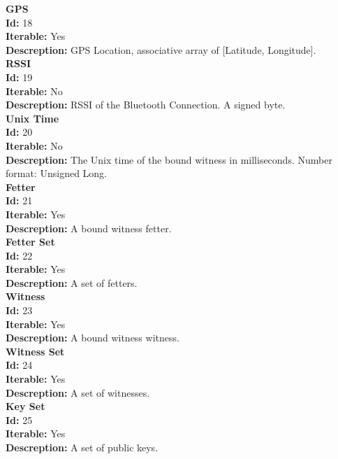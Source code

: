 \documentclass[11pt]{article}
\begin{document}
\noindent
\textbf{GPS} \\
\indent \textbf{Id:} 18 \\
\indent \textbf{Iterable:} Yes \\
\indent \textbf{Descreption:} GPS Location, associative array of [Latitude, Longitude]. \\

\noindent
\textbf{RSSI} \\
\indent \textbf{Id:} 19 \\
\indent \textbf{Iterable:} No \\
\indent \textbf{Descreption:} RSSI of the Bluetooth Connection. A signed byte. \\

\noindent
\textbf{Unix Time} \\
\indent \textbf{Id:} 20 \\
\indent \textbf{Iterable:} No \\
\indent \textbf{Descreption:} The Unix time of the bound witness in milliseconds. Number format: Unsigned Long. \\

\noindent
\textbf{Fetter} \\
\indent \textbf{Id:} 21 \\
\indent \textbf{Iterable:} Yes \\
\indent \textbf{Descreption:} A bound witness fetter. \\

\noindent
\textbf{Fetter Set} \\
\indent \textbf{Id:} 22 \\
\indent \textbf{Iterable:} Yes \\
\indent \textbf{Descreption:} A set of fetters. \\

\noindent
\textbf{Witness} \\
\indent \textbf{Id:} 23 \\
\indent \textbf{Iterable:} Yes \\
\indent \textbf{Descreption:} A bound witness witness. \\

\noindent
\textbf{Witness Set} \\
\indent \textbf{Id:} 24 \\
\indent \textbf{Iterable:} Yes \\
\indent \textbf{Descreption:} A set of witnesses. \\

\noindent
\textbf{Key Set} \\
\indent \textbf{Id:} 25 \\
\indent \textbf{Iterable:} Yes \\
\indent \textbf{Descreption:} A set of public keys. \\
\end{document}
